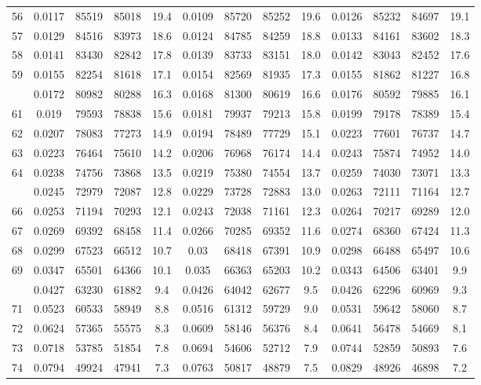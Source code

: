 \documentclass[
  14pt,
]{article}
\begin{document}
\begin{longtable}[t]{lcccccccccccc}
56 & 0.0117 & 85519 & 85018 & 19.4 & 0.0109 & 85720 & 85252 & 19.6 & 0.0126 & 85232 & 84697 & 19.1\\
57 & 0.0129 & 84516 & 83973 & 18.6 & 0.0124 & 84785 & 84259 & 18.8 & 0.0133 & 84161 & 83602 & 18.3\\
58 & 0.0141 & 83430 & 82842 & 17.8 & 0.0139 & 83733 & 83151 & 18.0 & 0.0142 & 83043 & 82452 & 17.6\\
59 & 0.0155 & 82254 & 81618 & 17.1 & 0.0154 & 82569 & 81935 & 17.3 & 0.0155 & 81862 & 81227 & 16.8\\
\addlinespace
60 & 0.0172 & 80982 & 80288 & 16.3 & 0.0168 & 81300 & 80619 & 16.6 & 0.0176 & 80592 & 79885 & 16.1\\
61 & 0.019 & 79593 & 78838 & 15.6 & 0.0181 & 79937 & 79213 & 15.8 & 0.0199 & 79178 & 78389 & 15.4\\
62 & 0.0207 & 78083 & 77273 & 14.9 & 0.0194 & 78489 & 77729 & 15.1 & 0.0223 & 77601 & 76737 & 14.7\\
63 & 0.0223 & 76464 & 75610 & 14.2 & 0.0206 & 76968 & 76174 & 14.4 & 0.0243 & 75874 & 74952 & 14.0\\
64 & 0.0238 & 74756 & 73868 & 13.5 & 0.0219 & 75380 & 74554 & 13.7 & 0.0259 & 74030 & 73071 & 13.3\\
\addlinespace
65 & 0.0245 & 72979 & 72087 & 12.8 & 0.0229 & 73728 & 72883 & 13.0 & 0.0263 & 72111 & 71164 & 12.7\\
66 & 0.0253 & 71194 & 70293 & 12.1 & 0.0243 & 72038 & 71161 & 12.3 & 0.0264 & 70217 & 69289 & 12.0\\
67 & 0.0269 & 69392 & 68458 & 11.4 & 0.0266 & 70285 & 69352 & 11.6 & 0.0274 & 68360 & 67424 & 11.3\\
68 & 0.0299 & 67523 & 66512 & 10.7 & 0.03 & 68418 & 67391 & 10.9 & 0.0298 & 66488 & 65497 & 10.6\\
69 & 0.0347 & 65501 & 64366 & 10.1 & 0.035 & 66363 & 65203 & 10.2 & 0.0343 & 64506 & 63401 & 9.9\\
\addlinespace
70 & 0.0427 & 63230 & 61882 & 9.4 & 0.0426 & 64042 & 62677 & 9.5 & 0.0426 & 62296 & 60969 & 9.3\\
71 & 0.0523 & 60533 & 58949 & 8.8 & 0.0516 & 61312 & 59729 & 9.0 & 0.0531 & 59642 & 58060 & 8.7\\
72 & 0.0624 & 57365 & 55575 & 8.3 & 0.0609 & 58146 & 56376 & 8.4 & 0.0641 & 56478 & 54669 & 8.1\\
73 & 0.0718 & 53785 & 51854 & 7.8 & 0.0694 & 54606 & 52712 & 7.9 & 0.0744 & 52859 & 50893 & 7.6\\
74 & 0.0794 & 49924 & 47941 & 7.3 & 0.0763 & 50817 & 48879 & 7.5 & 0.0829 & 48926 & 46898 & 7.2\\

\end{longtable}
\end{document}
